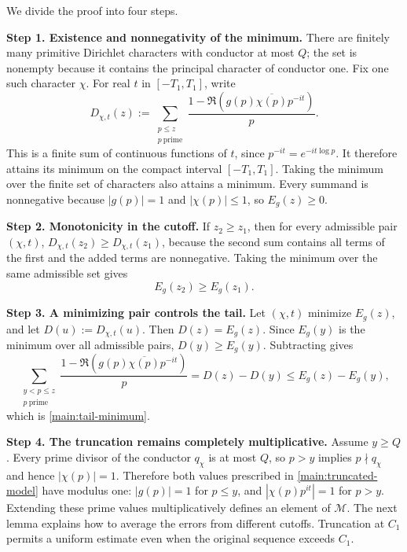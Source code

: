 \documentclass[twoside]{aomart}
\makeatletter
\theoremstyle{paperplain}
\theoremstyle{paperdefinition}
\renewenvironment{proof}[1][\proofname]{\par\pushQED{\qed}%
  \normalfont\topsep6\p@\@plus3\p@\relax\trivlist
  \item[\hskip\labelsep\itshape #1\@addpunct{.}]\ignorespaces
}{\popQED\endtrivlist\@endpefalse}
\numberwithin{equation}{section}
\makeatother
\begin{document}
\begin{proof}
We divide the proof into four steps.	
	
\par
\medskip
\noindent\textbf{Step 1. Existence and nonnegativity of the minimum.}
There are finitely many primitive Dirichlet characters with conductor at
most $Q$; the set is nonempty because it contains the principal character
of conductor one.  Fix one such character $\chi$.  For real $t$ in
$[-T_1,T_1]$, write
\[
 D_{\chi,t}(z):=\sum_{\substack{p\le z\\p\ \mathrm{prime}}}
 \frac{1-\Re(g(p)\overline{\chi(p)}p^{-it})}{p}.
\]
This is a finite sum of continuous functions of $t$, since
$p^{-it}=e^{-it\log p}$.  It therefore attains its minimum on the compact
interval $[-T_1,T_1]$.  Taking the minimum over the finite set of
characters also attains a minimum.  Every summand is nonnegative because
$|g(p)|=1$ and $|\chi(p)|\le1$, so $E_g(z)\ge0$.

\par
\medskip
\noindent\textbf{Step 2. Monotonicity in the cutoff.}
If $z_2\ge z_1$, then for every admissible pair $(\chi,t)$,
$D_{\chi,t}(z_2)\ge D_{\chi,t}(z_1)$, because the second sum contains all
terms of the first and the added terms are nonnegative.  Taking the minimum
over the same admissible set gives
\[
 E_g(z_2)\ge E_g(z_1).
\]

\par
\medskip
\noindent\textbf{Step 3. A minimizing pair controls the tail.}
Let $(\chi,t)$ minimize $E_g(z)$, and let $D(u):=D_{\chi,t}(u)$.  Then
$D(z)=E_g(z)$.  Since $E_g(y)$ is the minimum over all admissible pairs,
$D(y)\ge E_g(y)$.  Subtracting gives
\[
 \sum_{\substack{y<p\le z\\p\ \mathrm{prime}}}
 \frac{1-\Re(g(p)\overline{\chi(p)}p^{-it})}{p}
 =D(z)-D(y)
 \le E_g(z)-E_g(y),
\]
which is \eqref{main:tail-minimum}.

\par
\medskip
\noindent\textbf{Step 4. The truncation remains completely multiplicative.}
Assume $y\ge Q$.  Every prime divisor of the conductor $q_\chi$ is at most
$Q$, so $p>y$ implies $p\nmid q_\chi$ and hence $|\chi(p)|=1$.  Therefore
both values prescribed in \eqref{main:truncated-model} have modulus one:
$|g(p)|=1$ for $p\le y$, and $|\chi(p)p^{it}|=1$ for $p>y$.  Extending
these prime values multiplicatively defines an element of $\mathcal M$.
\end{proof}
The next lemma explains how to average the errors from different
cutoffs. Truncation at $C_1$ permits a uniform estimate even when
the original sequence exceeds $C_1$.
\end{document}
